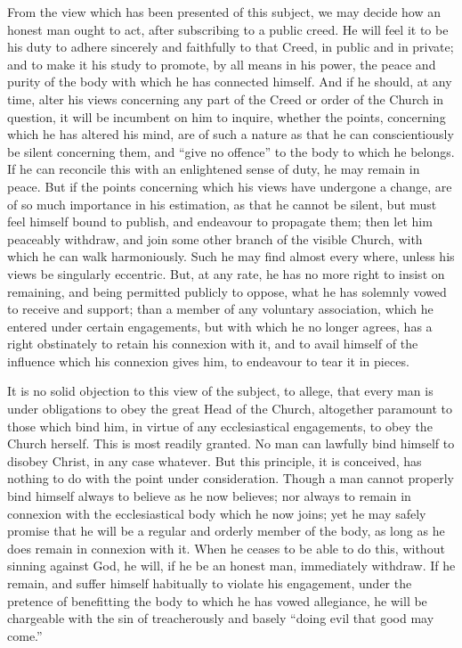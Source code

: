 \documentclass[
]{book}
\begin{document}
From the view which has been presented of this subject, we may decide how an honest man ought to act, after subscribing to a public creed. He will feel it to be his duty to adhere sincerely and faithfully to that Creed, in public and in private; and to make it his study to promote, by all means in his power, the peace and purity of the body with which he has connected himself. And if he should, at any time, alter his views concerning any part of the Creed or order of the Church in question, it will be incumbent on him to inquire, whether the points, concerning which he has altered his mind, are of such a nature as that he can conscientiously be silent concerning them, and ``give no offence'' to the body to which he belongs. If he can reconcile this with an enlightened sense of duty, he may remain in peace. But if the points concerning which his views have undergone a change, are of so much importance in his estimation, as that he cannot be silent, but must feel himself bound to publish, and endeavour to propagate them; then let him peaceably withdraw, and join some other branch of the visible Church, with which he can walk harmoniously. Such he may find almost every where, unless his views be singularly eccentric. But, at any rate, he has no more right to insist on remaining, and being permitted publicly to oppose, what he has solemnly vowed to receive and support; than a member of any voluntary association, which he entered under certain engagements, but with which he no longer agrees, has a right obstinately to retain his connexion with it, and to avail himself of the influence which his connexion gives him, to endeavour to tear it in pieces.

It is no solid objection to this view of the subject, to allege, that every man is under obligations to obey the great Head of the Church, altogether paramount to those which bind him, in virtue of any ecclesiastical engagements, to obey the Church herself. This is most readily granted. No man can lawfully bind himself to disobey Christ, in any case whatever. But this principle, it is conceived, has nothing to do with the point under consideration. Though a man cannot properly bind himself always to believe as he now believes; nor always to remain in connexion with the ecclesiastical body which he now joins; yet he may safely promise that he will be a regular and orderly member of the body, as long as he does remain in connexion with it. When he ceases to be able to do this, without sinning against God, he will, if he be an honest man, immediately withdraw. If he remain, and suffer himself habitually to violate his engagement, under the pretence of benefitting the body to which he has vowed allegiance, he will be chargeable with the sin of treacherously and basely ``doing evil that good may come.''
\end{document}
